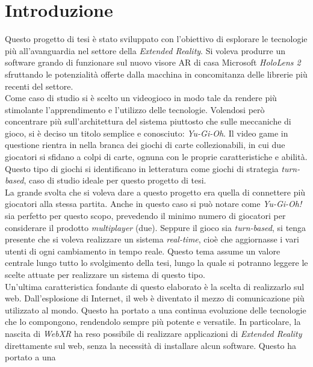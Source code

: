 \chapter{Introduzione}

Questo progetto di tesi è stato sviluppato con l'obiettivo di esplorare le tecnologie più all'avanguardia nel settore della \textit{Extended Reality}. Si voleva produrre un software
grando di funzionare sul nuovo visore AR di casa Microsoft \textit{HoloLens 2} sfruttando le potenzialità offerte dalla macchina in concomitanza delle librerie più recenti
del settore.\\
\newline
Come caso di studio si è scelto un videogioco in modo tale da rendere più stimolante l'apprendimento e l'utilizzo delle tecnologie. Volendosi però concentrare più sull'architettura
del sistema piuttosto che sulle meccaniche di gioco, si è deciso un titolo semplice e conosciuto: \textit{Yu-Gi-Oh}. Il video game in questione rientra in nella branca dei giochi di
carte collezionabili, in cui due giocatori si sfidano a colpi di carte, ognuna con le proprie caratteristiche e abilità. Questo tipo di giochi si identificano in letteratura come
giochi di strategia \textit{turn-based}, caso di studio ideale per questo progetto di tesi.\\
\newline
La grande svolta che si voleva dare a questo progetto era quella di connettere più giocatori alla stessa partita. Anche in questo caso si può notare come \textit{Yu-Gi-Oh!} sia 
perfetto per questo scopo, prevedendo il minimo numero di giocatori per considerare il prodotto \textit{multiplayer} (due). Seppure il gioco sia \textit{turn-based}, si tenga presente
che si voleva realizzare un sistema \textit{real-time}, cioè che aggiornasse i vari utenti di ogni cambiamento in tempo reale. Questo tema assume un valore centrale lungo tutto lo
svolgimento della tesi, lungo la quale si potranno leggere le scelte attuate per realizzare un sistema di questo tipo.\\
\newline
Un'ultima caratteristica fondante di questo elaborato è la scelta di realizzarlo sul web. Dall'esplosione di Internet, il web è diventato il mezzo di comunicazione più utilizzato
al mondo. Questo ha portato a una continua evoluzione delle tecnologie che lo compongono, rendendolo sempre più potente e versatile. In particolare, la nascita di \textit{WebXR} ha
reso possibile di realizzare applicazioni di \textit{Extended Reality} direttamente sul web, senza la necessità di installare alcun software. Questo ha portato a una
